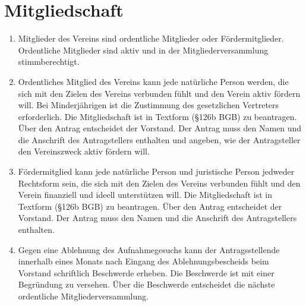\documentclass[ngerman]{article}
\begin{document}
\section{Mitgliedschaft}
\begin{enumerate}
  \item Mitglieder des Vereins sind ordentliche Mitglieder oder Fördermitglieder. Ordentliche Mitglieder sind aktiv und in der Mitgliederversammlung stimmberechtigt.
  \item Ordentliches Mitglied des Vereins kann jede natürliche Person werden, die sich mit den Zielen des Vereins verbunden fühlt und den Verein aktiv fördern will. Bei Minderjährigen ist die Zustimmung des gesetzlichen Vertreters erforderlich. Die Mitgliedschaft ist in Textform (§126b BGB) zu beantragen. Über den Antrag entscheidet der Vorstand. Der Antrag muss den Namen und die Anschrift des Antragstellers enthalten und angeben, wie der Antragsteller den Vereinszweck aktiv fördern will.
  \item Fördermitglied kann jede natürliche Person und juristische Person jedweder Rechtsform sein, die sich mit den Zielen des Vereins verbunden fühlt und den Verein finanziell und ideell unterstützen will. Die Mitgliedschaft ist in Textform (§126b BGB) zu beantragen. Über den Antrag entscheidet der Vorstand. Der Antrag muss den Namen und die Anschrift des Antragstellers enthalten. 
  \item Gegen eine Ablehnung des Aufnahmegesuchs kann der Antragsstellende innerhalb eines Monats nach Eingang des Ablehnungsbescheids beim Vorstand schriftlich Beschwerde erheben. Die Beschwerde ist mit einer Begründung zu versehen. Über die Beschwerde entscheidet die nächste ordentliche Mitgliederversammlung.
\end{enumerate}
\end{document}
